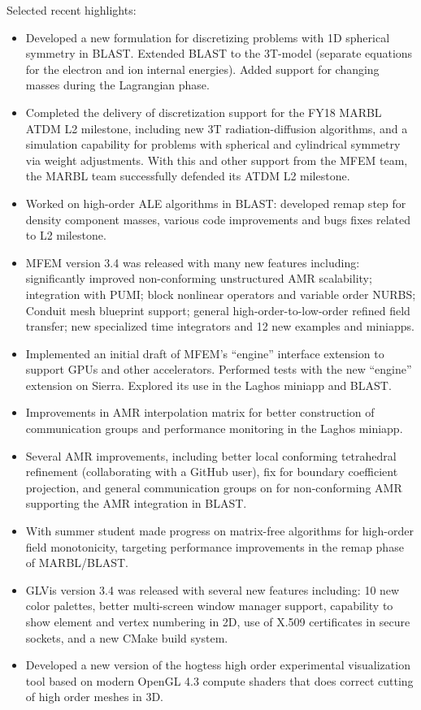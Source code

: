 Selected recent highlights:
\begin{itemize}
\item
Developed a new formulation for discretizing problems with 1D spherical symmetry
in BLAST. Extended BLAST to the 3T-model (separate equations for the electron
and ion internal energies). Added support for changing masses during the
Lagrangian phase.
\item
Completed the delivery of discretization support for the FY18 MARBL ATDM L2
milestone, including new 3T radiation-diffusion algorithms, and a simulation
capability for problems with spherical and cylindrical symmetry via weight
adjustments. With this and other support from the MFEM team, the MARBL team
successfully defended its ATDM L2 milestone.
\item
Worked on high-order ALE algorithms in BLAST: developed remap step for density
component masses, various code improvements and bugs fixes related to L2
milestone.
\item
MFEM version 3.4 was released with many new features including: significantly
improved non-conforming unstructured AMR scalability; integration with PUMI;
block nonlinear operators and variable order NURBS; Conduit mesh blueprint
support; general high-order-to-low-order refined field transfer; new specialized
time integrators and 12 new examples and miniapps.
\item
Implemented an initial draft of MFEM’s ``engine'' interface extension to support
GPUs and other accelerators. Performed tests with the new ``engine'' extension
on Sierra. Explored its use in the Laghos miniapp and BLAST.
\item
Improvements in AMR interpolation matrix for better construction of
communication groups and performance monitoring in the Laghos miniapp.
\item
Several AMR improvements, including better local conforming tetrahedral
refinement (collaborating with a GitHub user), fix for boundary coefficient
projection, and general communication groups on for non-conforming AMR
supporting the AMR integration in BLAST.
\item
With summer student made progress on matrix-free algorithms for high-order field
monotonicity, targeting performance improvements in the remap phase of
MARBL/BLAST.
\item
GLVis version 3.4 was released with several new features including: 10 new color
palettes, better multi-screen window manager support, capability to show element
and vertex numbering in 2D, use of X.509 certificates in secure sockets, and a
new CMake build system.
\item
Developed a new version of the hogtess high order experimental visualization
tool based on modern OpenGL 4.3 compute shaders that does correct cutting of
high order meshes in 3D.
\end{itemize}

